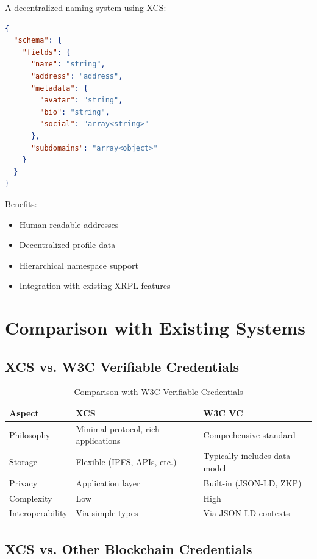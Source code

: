 \documentclass[11pt,a4paper]{article}
\begin{document}
A decentralized naming system using XCS:

\begin{lstlisting}[language=json,caption={XRP Name Service Schema}]
{
  "schema": {
    "fields": {
      "name": "string",
      "address": "address",
      "metadata": {
        "avatar": "string",
        "bio": "string",
        "social": "array<string>"
      },
      "subdomains": "array<object>"
    }
  }
}
\end{lstlisting}

Benefits:
\begin{itemize}
    \item Human-readable addresses
    \item Decentralized profile data
    \item Hierarchical namespace support
    \item Integration with existing XRPL features
\end{itemize}

\section{Comparison with Existing Systems}

\subsection{XCS vs. W3C Verifiable Credentials}

\begin{table}[h]
\centering
\begin{tabular}{lll}
\toprule
\textbf{Aspect} & \textbf{XCS} & \textbf{W3C VC} \\
\midrule
Philosophy & Minimal protocol, rich applications & Comprehensive standard \\
Storage & Flexible (IPFS, APIs, etc.) & Typically includes data model \\
Privacy & Application layer & Built-in (JSON-LD, ZKP) \\
Complexity & Low & High \\
Interoperability & Via simple types & Via JSON-LD contexts \\
\bottomrule
\end{tabular}
\caption{Comparison with W3C Verifiable Credentials}
\end{table}

\subsection{XCS vs. Other Blockchain Credentials}
\end{document}
